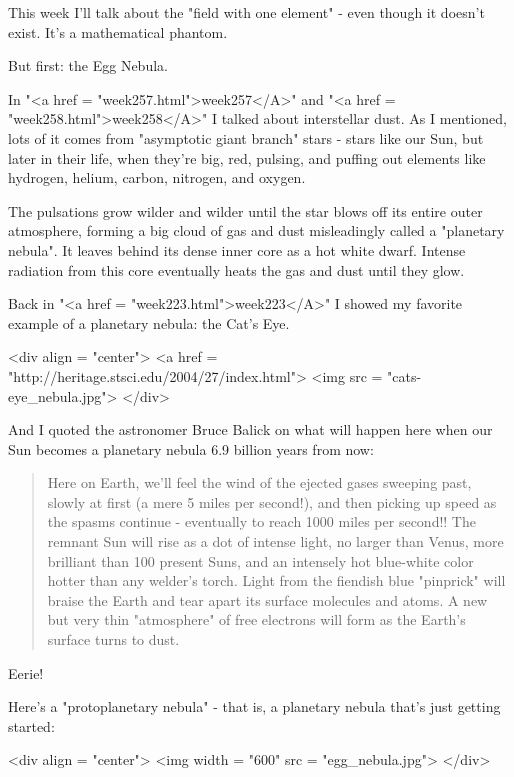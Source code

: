 

This week I'll talk about the "field with one element" - even though 
it doesn't exist.  It's a mathematical phantom.

But first: the Egg Nebula.

In "<a href = "week257.html">week257</A>" and "<a href
= "week258.html">week258</A>" I talked about interstellar dust.
As I mentioned, lots of it comes from "asymptotic giant
branch" stars - stars like our Sun, but later in their life, when
they're big, red, pulsing, and puffing out elements like hydrogen,
helium, carbon, nitrogen, and oxygen.

The pulsations grow wilder and wilder until the star blows off its 
entire outer atmosphere, forming a big cloud of gas and dust 
misleadingly called a "planetary nebula".  It leaves behind 
its dense inner core as a hot white dwarf.  Intense radiation from
this core eventually heats the gas and dust until they glow.

Back in "<a href = "week223.html">week223</A>" I showed my favorite 
example of a planetary nebula: the Cat's Eye.   

<div align = "center">
<a href = "http://heritage.stsci.edu/2004/27/index.html">
<img src = "cats-eye_nebula.jpg">
</div>

And I quoted the astronomer Bruce Balick 
on what will happen here when our Sun becomes a planetary nebula 
6.9 billion years from now:

\begin{quote}
     Here on Earth, we'll feel the wind of the ejected gases 
     sweeping past, slowly at first (a mere 5 miles per second!), 
     and then picking up speed as the spasms continue - eventually 
     to reach 1000 miles per second!!  The remnant Sun will rise as 
     a dot of intense light, no larger than Venus, more brilliant 
     than 100 present Suns, and an intensely hot blue-white color 
     hotter than any welder's torch.  Light from the fiendish blue 
     "pinprick" will braise the Earth and tear apart its surface 
     molecules and atoms. A new but very thin "atmosphere" of free 
     electrons will form as the Earth's surface turns to dust.
\end{quote}
Eerie!  

Here's a "protoplanetary nebula" - that is, a planetary nebula that's
just getting started: 

<div align = "center">
<img width = "600" src = "egg_nebula.jpg">
</div>

